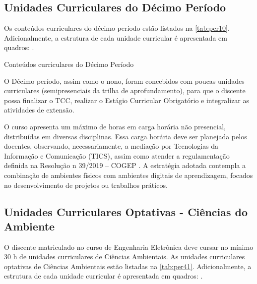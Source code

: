 \clearpage

\subsection{Unidades Curriculares do Décimo Período}

Os conteúdos curriculares do décimo período estão listados na \autoref{tab:per10}. Adicionalmente, a estrutura de cada unidade curricular é apresentada em quadros: .

\begin{table}[!htb]
	\centering\footnotesize
	\caption{Conteúdos curriculares do Décimo Período}
	\label{tab:per10}
\end{table}

\clearpage

O Décimo período, assim como o nono, foram concebidos com poucas unidades curriculares (semipresenciais da trilha de aprofundamento), para que o discente possa finalizar o TCC, realizar o Estágio Curricular Obrigatório e integralizar as atividades de extensão.

O curso apresenta um máximo de \the\value{horasANP} horas em carga horária não presencial, distribuídas em diversas disciplinas. Essa carga horária deve ser planejada pelos docentes, observando, necessariamente, a mediação por Tecnologias da Informação e Comunicação (TICS), assim como atender a regulamentação definida na Resolução n\textordmasculine{} 39/2019 – COGEP \cite{cogep39}. A estratégia adotada contempla a combinação de ambientes físicos com ambientes digitais de aprendizagem, focados no desenvolvimento de projetos ou trabalhos práticos.

\subsection{Unidades Curriculares Optativas - Ciências do Ambiente}

O discente matriculado no curso de Engenharia Eletrônica deve cursar no mínimo 30 h de unidades curriculares de Ciências Ambientais. As unidades curriculares optativas de Ciências Ambientais estão listadas na \autoref{tab:per41}. Adicionalmente, a estrutura de cada unidade curricular é apresentada em quadros: . %

